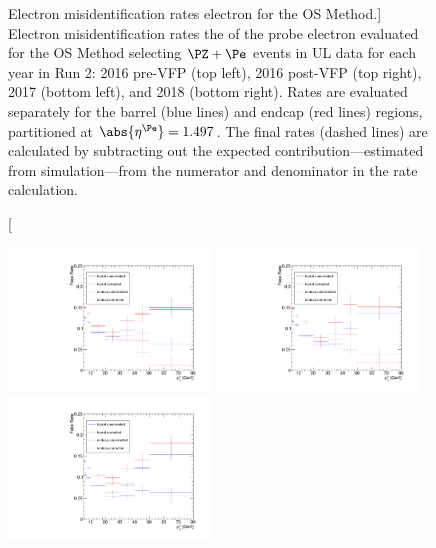 \begin{figure}[!htbp]
\begin{center}
		\caption
			[Electron misidentification rates \vs electron \pt for the OS Method.]
			{
			Electron misidentification rates \vs the \pt of the probe electron evaluated for the OS Method selecting $\PZ + \Pe$ events in UL data
			for each year in Run 2:
			2016 pre-VFP (top left),
			2016 post-VFP (top right),
			2017 (bottom left), and
			2018 (bottom right).
			Rates are evaluated separately for the barrel (blue lines) and endcap (red lines) regions,
			partitioned at $\abs{\eta^{\Pe}} = 1.497$.
			The final rates (dashed lines) are calculated by subtracting out the expected \WZ contribution---estimated from simulation---from the numerator and denominator in the rate calculation.
		}
		\label{fr_plots_el}
	\end{center}
\end{figure}
\begin{figure}[!htbp]
	\begin{center}
		\includegraphics[width=0.48\textwidth]{figures/higgsmassmeas/redbkg/fr/fakerates_UL2016preVFP_mu_yaxis_full.pdf}
		\includegraphics[width=0.48\textwidth]{figures/higgsmassmeas/redbkg/fr/fakerates_UL2016postVFP_mu_yaxis_full.pdf}
		\includegraphics[width=0.48\textwidth]{figures/higgsmassmeas/redbkg/fr/fakerates_UL2017_mu_yaxis_full.pdf}

\end{center}
\end{figure}
